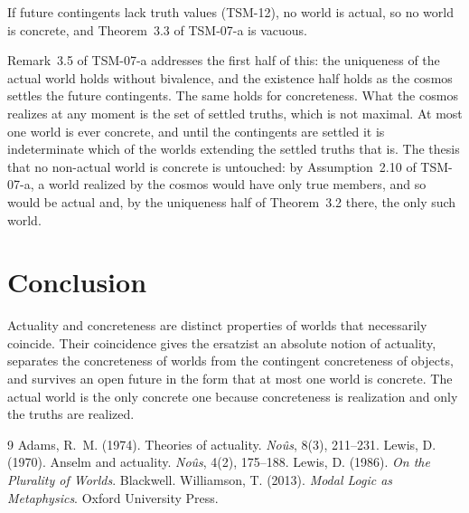 \documentclass{situationist-preprint}
\begin{document}
\begin{objection}
If future contingents lack truth values (TSM-12), no world is actual, so no world is concrete, and Theorem~3.3 of TSM-07-a is vacuous.
\end{objection}

\begin{reply}
Remark~3.5 of TSM-07-a addresses the first half of this: the uniqueness of the actual world holds without bivalence, and the existence half holds as the cosmos settles the future contingents. The same holds for concreteness. What the cosmos realizes at any moment is the set of settled truths, which is not maximal. At most one world is ever concrete, and until the contingents are settled it is indeterminate which of the worlds extending the settled truths that is. The thesis that no non-actual world is concrete is untouched: by Assumption~2.10 of TSM-07-a, a world realized by the cosmos would have only true members, and so would be actual and, by the uniqueness half of Theorem~3.2 there, the only such world.
\end{reply}

\section{Conclusion}

Actuality and concreteness are distinct properties of worlds that necessarily coincide. Their coincidence gives the ersatzist an absolute notion of actuality, separates the concreteness of worlds from the contingent concreteness of objects, and survives an open future in the form that at most one world is concrete. The actual world is the only concrete one because concreteness is realization and only the truths are realized.

\begin{thebibliography}{9}
 Adams, R.~M. (1974). Theories of actuality. \emph{No\^us}, 8(3), 211--231.
 Lewis, D. (1970). Anselm and actuality. \emph{No\^us}, 4(2), 175--188.
 Lewis, D. (1986). \emph{On the Plurality of Worlds}. Blackwell.
 Williamson, T. (2013). \emph{Modal Logic as Metaphysics}. Oxford University Press.
\end{thebibliography}
\end{document}
